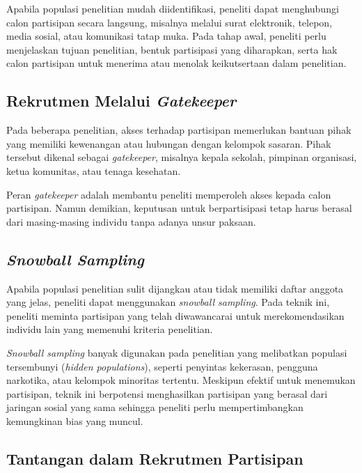 \documentclass[
  indonesian,
  letterpaper,
  DIV=11,
  numbers=noendperiod]{scrreprt}
\begin{document}
Apabila populasi penelitian mudah diidentifikasi, peneliti dapat
menghubungi calon partisipan secara langsung, misalnya melalui surat
elektronik, telepon, media sosial, atau komunikasi tatap muka. Pada
tahap awal, peneliti perlu menjelaskan tujuan penelitian, bentuk
partisipasi yang diharapkan, serta hak calon partisipan untuk menerima
atau menolak keikutsertaan dalam penelitian.

\subsection{\texorpdfstring{Rekrutmen Melalui
\emph{Gatekeeper}}{Rekrutmen Melalui Gatekeeper}}\label{rekrutmen-melalui-gatekeeper}

Pada beberapa penelitian, akses terhadap partisipan memerlukan bantuan
pihak yang memiliki kewenangan atau hubungan dengan kelompok sasaran.
Pihak tersebut dikenal sebagai \emph{gatekeeper}, misalnya kepala
sekolah, pimpinan organisasi, ketua komunitas, atau tenaga kesehatan.

Peran \emph{gatekeeper} adalah membantu peneliti memperoleh akses kepada
calon partisipan. Namun demikian, keputusan untuk berpartisipasi tetap
harus berasal dari masing-masing individu tanpa adanya unsur paksaan.

\subsection{\texorpdfstring{\emph{Snowball
Sampling}}{Snowball Sampling}}\label{sec-snowball}

Apabila populasi penelitian sulit dijangkau atau tidak memiliki daftar
anggota yang jelas, peneliti dapat menggunakan \emph{snowball sampling}.
Pada teknik ini, peneliti meminta partisipan yang telah diwawancarai
untuk merekomendasikan individu lain yang memenuhi kriteria penelitian.

\emph{Snowball sampling} banyak digunakan pada penelitian yang
melibatkan populasi tersembunyi (\emph{hidden populations}), seperti
penyintas kekerasan, pengguna narkotika, atau kelompok minoritas
tertentu. Meskipun efektif untuk menemukan partisipan, teknik ini
berpotensi menghasilkan partisipan yang berasal dari jaringan sosial
yang sama sehingga peneliti perlu mempertimbangkan kemungkinan bias yang
muncul.

\subsection{Tantangan dalam Rekrutmen
Partisipan}\label{tantangan-dalam-rekrutmen-partisipan}
\end{document}
